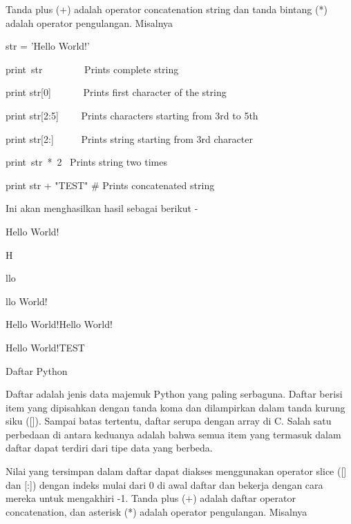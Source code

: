 \vspace{12pt}
\noindent 
Tanda plus (+) adalah operator concatenation string dan tanda bintang (*) adalah operator pengulangan. $  $Misalnya  \par
\vspace{12pt}
\vspace{12pt}
\noindent 
str = 'Hello World!' \par
\vspace{12pt}
\noindent 
print~str~~~~~~~~  Prints complete string \par
\noindent 
print str[0]~~~~~~  Prints first character of the string \par
\noindent 
print str[2:5]~~~~  Prints characters starting from 3rd to 5th \par
\noindent 
print str[2:]~~~~~  Prints string starting from 3rd character \par
\noindent 
print~str~*~2~     Prints string two times \par
\noindent 
print str + "TEST"  $  \#  $ Prints concatenated string \par
\vspace{12pt}
\noindent 
Ini akan menghasilkan hasil sebagai berikut - \par
\vspace{12pt}
\noindent 
Hello World! \par
\noindent 
H \par
\noindent 
llo \par
\noindent 
llo World! \par
\noindent 
Hello World!Hello World! \par
\noindent 
Hello World!TEST \par
\vspace{12pt}
\noindent 
Daftar Python \par
\vspace{12pt}
\noindent 
Daftar adalah jenis data majemuk Python yang paling serbaguna. $  $Daftar berisi item yang dipisahkan dengan tanda koma dan dilampirkan dalam tanda kurung siku ([]). $  $Sampai batas tertentu, daftar serupa dengan array di C. Salah satu perbedaan di antara keduanya adalah bahwa semua item yang termasuk dalam daftar dapat terdiri dari tipe data yang berbeda. \par
\vspace{12pt}
\noindent 
Nilai yang tersimpan dalam daftar dapat diakses menggunakan operator slice ([] dan [:]) dengan indeks mulai dari 0 di awal daftar dan bekerja dengan cara mereka untuk mengakhiri -1. $  $Tanda plus (+) adalah daftar operator concatenation, dan asterisk (*) adalah operator pengulangan. $  $Misalnya  \par
